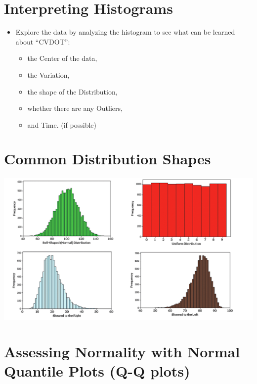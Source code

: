 \documentclass[]{book}
\providecommand{\tightlist}{%
  \setlength{\itemsep}{0pt}\setlength{\parskip}{0pt}}
\begin{document}
\hypertarget{interpreting-histograms}{%
\section{Interpreting Histograms}\label{interpreting-histograms}}

\begin{itemize}
\item
  Explore the data by analyzing the histogram to see what can be learned about ``CVDOT'':

  \begin{itemize}
  \tightlist
  \item
    the Center of the data,
  \item
    the Variation,
  \item
    the shape of the Distribution,
  \item
    whether there are any Outliers,
  \item
    and Time. (if possible)
  \end{itemize}
\end{itemize}

\hypertarget{common-distribution-shapes}{%
\section{Common Distribution Shapes}\label{common-distribution-shapes}}

\includegraphics{shapes.png}

\hypertarget{assessing-normality-with-normal-quantile-plots-q-q-plots}{%
\section{Assessing Normality with Normal Quantile Plots (Q-Q plots)}\label{assessing-normality-with-normal-quantile-plots-q-q-plots}}
\end{document}
